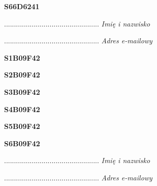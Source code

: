 \begin{turn}{90}\huge \textbf{S66D6241}\end{turn}

\begin{turn}{90}\begin{minipage}{\linewidth} \vspace{20mm} ................................................  \textit{Imię i nazwisko}\end{minipage}\end{turn}

\begin{turn}{90}\begin{minipage}{\linewidth} \vspace{20mm} ................................................  \textit{Adres e-mailowy}\end{minipage}\end{turn}

\begin{turn}{90}\huge \textbf{S1B09F42}\end{turn}

\begin{turn}{90}\huge \textbf{S2B09F42}\end{turn}

\begin{turn}{90}\huge \textbf{S3B09F42}\end{turn}

\begin{turn}{90}\huge \textbf{S4B09F42}\end{turn}

\begin{turn}{90}\huge \textbf{S5B09F42}\end{turn}

\begin{turn}{90}\huge \textbf{S6B09F42}\end{turn}

\begin{turn}{90}\begin{minipage}{\linewidth} \vspace{20mm} ................................................  \textit{Imię i nazwisko}\end{minipage}\end{turn}

\begin{turn}{90}\begin{minipage}{\linewidth} \vspace{20mm} ................................................  \textit{Adres e-mailowy}\end{minipage}\end{turn}

